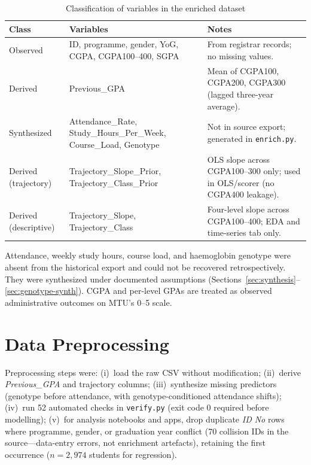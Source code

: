 \documentclass[12pt]{report}
\begin{document}
	\begin{table}[htbp]
		\centering
		\caption{Classification of variables in the enriched dataset}
		\label{tab:data-sources}
		\small
		\begin{tabularx}{\textwidth}{@{}>{\raggedright\arraybackslash}p{2.4cm} >{\raggedright\arraybackslash}p{4.6cm} >{\raggedright\arraybackslash}X@{}}
			\hline
			\textbf{Class} & \textbf{Variables} & \textbf{Notes} \\
			\hline
			Observed & ID, programme, gender, YoG, CGPA, CGPA100--400, SGPA & From registrar records; no missing values. \\
			Derived & Previous\_GPA & Mean of CGPA100, CGPA200, CGPA300 (lagged three-year average). \\
			Synthesized & Attendance\_Rate, Study\_Hours\_Per\_Week, Course\_Load, Genotype & Not in source export; generated in \texttt{enrich.py}. \\
			Derived (trajectory) & Trajectory\_Slope\_Prior, Trajectory\_Class\_Prior & OLS slope across CGPA100--300 only; used in OLS/scorer (no CGPA400 leakage). \\
			Derived (descriptive) & Trajectory\_Slope, Trajectory\_Class & Four-level slope across CGPA100--400; EDA and time-series tab only. \\
			\hline
		\end{tabularx}
	\end{table}
	
	Attendance, weekly study hours, course load, and haemoglobin genotype were absent from the historical export and could not be recovered retrospectively. They were synthesized under documented assumptions (Sections~\ref{sec:synthesis}--\ref{sec:genotype-synth}). CGPA and per-level GPAs are treated as observed administrative outcomes on MTU's 0--5 scale.
	
	\section{Data Preprocessing}
	Preprocessing steps were: (i)~load the raw CSV without modification; (ii)~derive \textit{Previous\_GPA} and trajectory columns; (iii)~synthesize missing predictors (genotype before attendance, with genotype-conditioned attendance shifts); (iv)~run 52 automated checks in \texttt{verify.py} (exit code 0 required before modelling); (v)~for analysis notebooks and apps, drop duplicate \textit{ID No} rows where programme, gender, or graduation year conflict (70 collision IDs in the source---data-entry errors, not enrichment artefacts), retaining the first occurrence ($n = 2{,}974$ students for regression).
	
\end{document}
